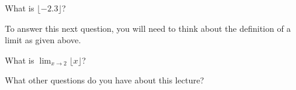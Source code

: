 \documentclass{ximera}
\begin{document}
\begin{question}
What is $\lfloor -2.3\rfloor$?
\begin{multipleChoice}
\end{multipleChoice}
\end{question}

To answer this next question, you will need to think about the
definition of a limit as given above.

\begin{question}
What is $\lim_{x\to 2}\lfloor x\rfloor$?
\begin{multipleChoice}
\end{multipleChoice}
\end{question}


\begin{question}
What other questions do you have about this lecture?
\begin{freeResponse}
\end{freeResponse}
\end{question}
\end{document}
